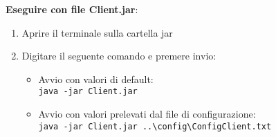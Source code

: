 \documentclass[11pt, a4paper, oneside]{article}
\begin{document}
\textbf{Eseguire con file Client.jar}:
\begin{enumerate}
    \item Aprire il terminale sulla cartella jar
    \item Digitare il seguente comando e premere invio:
    \begin{itemize}
        \item Avvio con valori di default:\\
        \texttt{java -jar Client.jar}
        \item Avvio con valori prelevati dal file di configurazione:\\
        \texttt{java -jar Client.jar ..\textbackslash config\textbackslash ConfigClient.txt}
    \end{itemize}
\end{enumerate}
\end{document}
